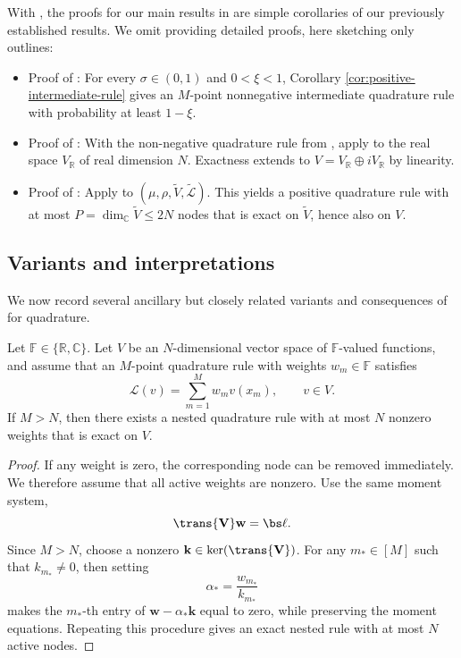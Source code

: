 \documentclass[10pt,dvipsnames]{amsart}
\begin{document}
With , the proofs for our main results in  are simple corollaries of our previously established results. We omit providing detailed proofs, here sketching only outlines:
\begin{itemize}
  \item Proof of : For every
  \(\sigma\in(0,1)\) and \(0<\xi<1\), Corollary
  \ref{cor:positive-intermediate-rule} gives an \(M\)-point nonnegative
  intermediate quadrature rule with probability at least \(1-\xi\).
  \item Proof of : With the non-negative quadrature rule from , apply  to the real space \(V_{\mathbb R}\) of real dimension \(N\). Exactness extends to \(V = V_{\mathbb R} \oplus i V_{\mathbb R}\) by linearity.
  \item Proof of : Apply
   to
  \((\mu,\rho,\widetilde V,\widetilde{\mathcal L})\). This yields a positive
  quadrature rule with at most
  \(P=\dim_{\mathbb C}\widetilde V\leq2N\) nodes that is exact on
  \(\widetilde V\), hence also on \(V\).
\end{itemize}

\subsection{Variants and interpretations}
We now record several ancillary but closely related variants and consequences of  for quadrature.
\begin{corollary}
\label{lem:algebraic-pruning}
Let \(\mathbb F \in \{\mathbb {R}, \mathbb{C}\}\).  Let \(V\) be an
\(N\)-dimensional vector space of \(\mathbb F\)-valued functions, and assume
that an \(M\)-point quadrature rule with weights \(w_m\in\mathbb F\)
satisfies
\[
    \mathcal L(v)=\sum_{m=1}^M w_m v(x_m),
    \qquad v\in V.
\]
If \(M>N\), then there exists a nested quadrature rule with at most \(N\)
nonzero weights that is exact on \(V\).
\end{corollary}

\begin{proof}
If any weight is zero, the corresponding node can be removed immediately.
We therefore assume that all active weights are nonzero.
Use the same moment system,
\[
    \trans{\mathbf V}\mathbf w=\bs\ell.
\]
Since \(M>N\), choose a nonzero
\(\mathbf k\in\ker(\trans{\mathbf V})\).  For any $m_\ast \in [M]$ such that \(k_{m_*}\neq0\), then setting
\[
    \alpha_*=\frac{w_{m_*}}{k_{m_*}}
\]
makes the \(m_*\)-th entry of \(\mathbf w-\alpha_*\mathbf k\) equal to zero,
while preserving the moment equations.  Repeating this procedure gives an exact
nested rule with at most \(N\) active nodes.
\end{proof}
\end{document}
